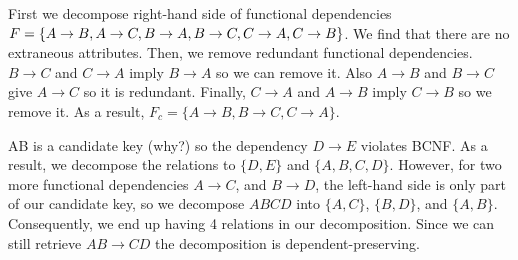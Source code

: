 \documentclass{homework}
\begin{document}
\question First we decompose right-hand side of functional dependencies $F= \{A\rightarrow B, A\rightarrow C, \newline B\rightarrow A, B\rightarrow C, C\rightarrow A, C\rightarrow B\}$. We find that there are no extraneous attributes.
Then, we remove redundant functional dependencies. $B\rightarrow C$ and $C\rightarrow A$ imply $B\rightarrow A$ so we can remove it. Also $A\rightarrow B$ and $B\rightarrow C$ give $A\rightarrow C$ so it is redundant. Finally, $C\rightarrow A$ and $A\rightarrow B$ imply $C\rightarrow B$ so we remove it. As a result, $F_c=\{A\rightarrow B, B\rightarrow C, C\rightarrow A\}$.

\question AB is a candidate key (why?) so the dependency $D\rightarrow E$ violates BCNF. As a result, we decompose the relations to $\{D, E\}$ and $\{A, B, C, D\}$. However, for two more functional dependencies $A\rightarrow C$, and $B\rightarrow D$, the left-hand side is only part of our candidate key, so we decompose $ABCD$ into $\{A, C\}$, $\{B, D\}$, and $\{A, B\}$. Consequently, we end up having 4 relations in our decomposition. Since we can still retrieve $AB\rightarrow CD$ the decomposition is dependent-preserving.  
\end{document}
